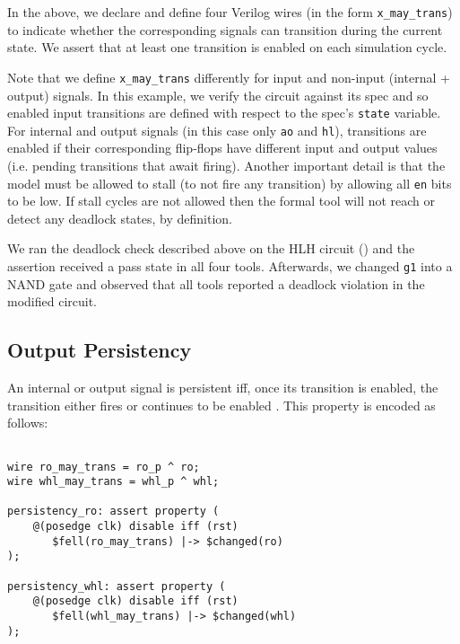 In the above, we declare and define four Verilog wires (in the form
\texttt{x\_may\_trans}) to indicate whether the corresponding signals can
transition during the current state. We assert that at least one transition is
enabled on each simulation cycle.

Note that we define \texttt{x\_may\_trans} differently for input and non-input
(internal + output) signals. In this example, we verify the circuit against
its spec and so enabled input transitions are defined with respect to the
spec's \texttt{state} variable. For internal and output signals (in this case
only \texttt{ao} and \texttt{hl}), transitions are enabled if their
corresponding flip-flops have different input and output values (i.e. pending
transitions that await firing). Another important detail is that the model
must be allowed to stall (to not fire any transition) by allowing all
\texttt{en} bits to be low. If stall cycles are not allowed then the formal
tool will not reach or detect any deadlock states, by definition.

We ran the deadlock check described above on the HLH circuit
() and the assertion received a pass state in all four
tools. Afterwards, we changed \texttt{g1} into a NAND gate and observed that
all tools reported a deadlock violation in the modified circuit.



\subsection{Output Persistency}
\label{subsec:persistency}

An internal or output signal is persistent iff, once its transition is
enabled, the transition either fires or continues to be enabled
\cite{poliakov2008automated}. This property is encoded as follows:

\vspace{0.2cm}

\begin{tcolorbox}[frame hidden,interior hidden,boxsep=0pt,boxrule=1pt]
	\footnotesize
	\begin{verbatim}

wire ro_may_trans = ro_p ^ ro;
wire whl_may_trans = whl_p ^ whl;

persistency_ro: assert property (
    @(posedge clk) disable iff (rst)
       $fell(ro_may_trans) |-> $changed(ro)
);

persistency_whl: assert property (
    @(posedge clk) disable iff (rst)
       $fell(whl_may_trans) |-> $changed(whl)
);
	\end{verbatim}
\end{tcolorbox}

